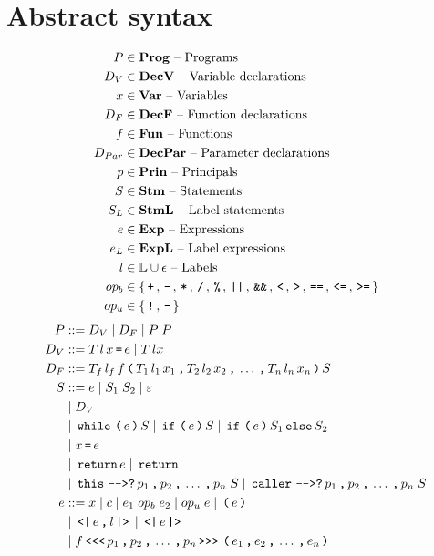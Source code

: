 \section{Abstract syntax}

\begin{align*}
  P       & \in \mathbf{Prog} \text{ -- Programs}\\
  D_V     & \in \mathbf{DecV} \text{ -- Variable declarations}\\
  x       & \in \mathbf{Var} \text{ -- Variables}\\
  D_F     & \in \mathbf{DecF} \text{ -- Function declarations}\\
  f       & \in \mathbf{Fun} \text{ -- Functions}\\
  D_{Par} & \in \mathbf{DecPar} \text{ -- Parameter declarations}\\
  p       & \in \mathbf{Prin} \text{ -- Principals}\\
  S       & \in \mathbf{Stm} \text{ -- Statements}\\
  S_L     & \in \mathbf{StmL} \text{ -- Label statements}\\
  e       & \in \mathbf{Exp} \text{ -- Expressions}\\
  e_L     & \in \mathbf{ExpL} \text{ -- Label expressions}\\
  l       & \in \mathbb{L} \cup \epsilon \text{ -- Labels}\\
  op_b    & \in \{ \, \texttt{+} \, ,  \, \texttt{-} \, ,  \, \texttt{*} \, ,  \, \texttt{/} \, ,  \, \texttt{\%} \, ,  \, \texttt{||} \, ,  \, \texttt{\&\&} \, ,  \, \texttt{<} \, ,  \, \texttt{>} \, ,  \, \texttt{==} \, ,  \, \texttt{<=} \, ,  \, \texttt{>=} \, \} \\
  op_u    & \in \{ \, \texttt{!} \, ,  \, \texttt{-} \, \}
\end{align*}
\begin{align*}
  P         & ::= D_V \gp D_F \gp P \; P \\
  D_V       & ::= T \, l \, x \tk = e \gp T \, l x \\
  D_F       & ::= T_f \, l_f \, f \tk ( T_1 \, l_1 \, x_1 \tk , T_2 \, l_2 \, x_2 \tk , \dots \tk , T_n \, l_n \, x_n \tk ) S \\
  S         & ::= e \gp S_1 \; S_2 \gp \varepsilon \\
            & \gp D_V \\
            & \gp \tk{while} \tk ( e \tk ) S \gp \tk{if} \tk ( e \tk ) S \gp \tk{if} \tk ( e \tk ) S_1 \tk{else} S_2 \\
            & \gp x \tk = e \\
            & \gp \tk{return} e \gp \tk{return} \\
            & \gp \tk{this} \tk{-{}->?} p_1 \tk , p_2 \tk , \dots \tk , p_n \; S \gp \tk{caller} \tk{-{}->?} p_1 \tk , p_2 \tk , \dots \tk , p_n \; S \\
  e         & ::= x \gp c \gp e_1 \; op_b \; e_2 \gp op_u \; e \gp \tk ( e \tk ) \\
            & \gp \tk{<|} e \tk , l \tk{|>} \gp \tk{<|} e \tk{|>} \\
            & \gp f \tk{<{}<{}<} p_1 \tk , p_2 \tk , \dots \tk , p_n \tk{>{}>{}>} \tk ( e_1 \tk , e_2 \tk , \dots \tk , e_n \tk )
\end{align*}
